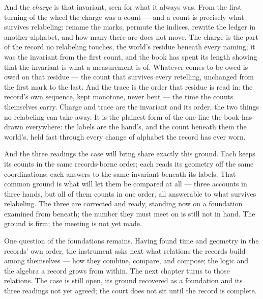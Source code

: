 And the \emph{charge} is that invariant, seen for what it always was. From the first turning of the wheel the
charge was a count --- and a count is precisely what survives relabeling: rename the marks, permute the indices,
rewrite the ledger in another alphabet, and how many there are does not move. The charge is the part of the
record no relabeling touches, the world's residue beneath every naming; it was the invariant from the first
count, and the book has spent its length showing that the invariant is what a measurement is of. Whatever comes
to be owed is owed on that residue --- the count that survives every retelling, unchanged from the first mark to
the last. And the trace is the order that residue is read in: the record's own sequence, kept monotone, never
bent --- the time the counts themselves carry. Charge and trace are the invariant and its order, the two things
no relabeling can take away. It is the plainest form of the one line the book has drawn everywhere: the labels
are the hand's, and the count beneath them the world's, held fast through every change of alphabet the record
has ever worn.

And the three readings the case will bring share exactly this ground. Each keeps its counts in the same
records-borne order; each reads its geometry off the same coordinations; each answers to the same invariant
beneath its labels. That common ground is what will let them be compared at all --- three accounts in three
hands, but all of them counts in one order, all answerable to what survives relabeling. The three are corrected
and ready, standing now on a foundation examined from beneath; the number they must meet on is still not in
hand. The ground is firm; the meeting is not yet made.

One question of the foundations remains. Having found time and geometry in the records' own order, the
instrument asks next what relations the records build among themselves --- how they combine, compare, and
compose; the logic and the algebra a record grows from within. The next chapter turns to those relations. The
case is still open, its ground recovered as a foundation and its three readings not yet agreed; the court does
not sit until the record is complete.

